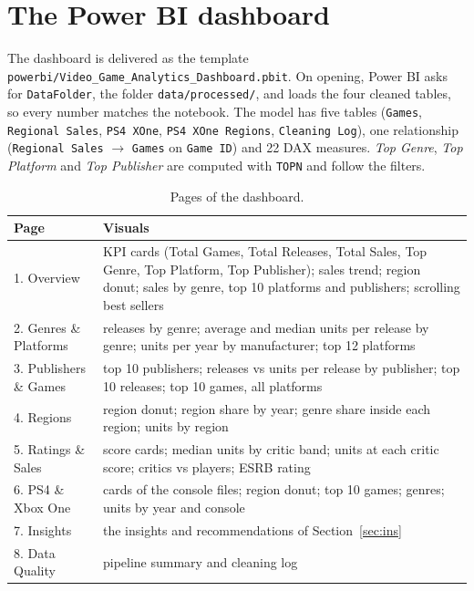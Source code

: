 \documentclass[12pt,a4paper]{article}
\begin{document}
\section{The Power BI dashboard}\label{sec:dash}

The dashboard is delivered as the template \nolinkurl{powerbi/Video_Game_Analytics_Dashboard.pbit}.
On opening, Power BI asks for \texttt{DataFolder}, the folder \texttt{data/processed/}, and
loads the four cleaned tables, so every number matches the notebook. The model has five
tables (\texttt{Games}, \texttt{Regional Sales}, \texttt{PS4 XOne}, \texttt{PS4 XOne Regions},
\texttt{Cleaning Log}), one relationship (\texttt{Regional Sales} $\to$ \texttt{Games} on
\texttt{Game ID}) and 22 DAX measures. \emph{Top Genre}, \emph{Top Platform} and \emph{Top
Publisher} are computed with \texttt{TOPN} and follow the filters.

\begin{table}[H]\centering\small
\caption{Pages of the dashboard.}
\begin{tabularx}{\linewidth}{@{}lX@{}}
\toprule
Page & Visuals\\\midrule
1. Overview & KPI cards (Total Games, Total Releases, Total Sales, Top Genre, Top Platform, Top Publisher); sales trend; region donut; sales by genre, top 10 platforms and publishers; scrolling best sellers\\
2. Genres \& Platforms & releases by genre; average and median units per release by genre; units per year by manufacturer; top 12 platforms\\
3. Publishers \& Games & top 10 publishers; releases vs units per release by publisher; top 10 releases; top 10 games, all platforms\\
4. Regions & region donut; region share by year; genre share inside each region; units by region\\
5. Ratings \& Sales & score cards; median units by critic band; units at each critic score; critics vs players; ESRB rating\\
6. PS4 \& Xbox One & cards of the console files; region donut; top 10 games; genres; units by year and console\\
7. Insights & the insights and recommendations of Section~\ref{sec:ins}\\
8. Data Quality & pipeline summary and cleaning log\\
\bottomrule
\end{tabularx}
\end{table}
\end{document}
